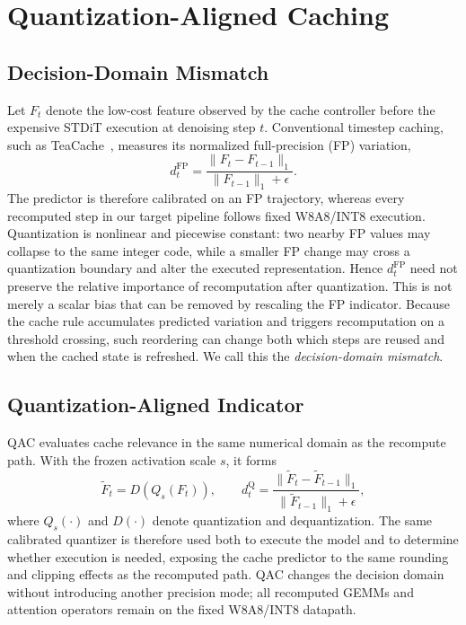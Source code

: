 \section{Quantization-Aligned Caching}
\label{sec:qac}

\subsection{Decision-Domain Mismatch}
Let $F_t$ denote the low-cost feature observed by the cache controller before the expensive STDiT execution at denoising step $t$. Conventional timestep caching, such as TeaCache~\cite{liu2025teacache}, measures its normalized full-precision (FP) variation,
\begin{equation}
 d_t^{\mathrm{FP}}=
 \frac{\lVert F_t-F_{t-1}\rVert_1}
      {\lVert F_{t-1}\rVert_1+\epsilon}.
 \label{eq:fp_indicator}
\end{equation}
The predictor is therefore calibrated on an FP trajectory, whereas every recomputed step in our target pipeline follows fixed W8A8/INT8 execution. Quantization is nonlinear and piecewise constant: two nearby FP values may collapse to the same integer code, while a smaller FP change may cross a quantization boundary and alter the executed representation. Hence $d_t^{\mathrm{FP}}$ need not preserve the relative importance of recomputation after quantization. This is not merely a scalar bias that can be removed by rescaling the FP indicator. Because the cache rule accumulates predicted variation and triggers recomputation on a threshold crossing, such reordering can change both which steps are reused and when the cached state is refreshed. We call this the \emph{decision-domain mismatch}.

\subsection{Quantization-Aligned Indicator}
QAC evaluates cache relevance in the same numerical domain as the recompute path. With the frozen activation scale $s$, it forms
\begin{equation}
 \widetilde F_t=D(Q_s(F_t)),\qquad
 d_t^{\mathrm Q}=
 \frac{\lVert\widetilde F_t-\widetilde F_{t-1}\rVert_1}
      {\lVert\widetilde F_{t-1}\rVert_1+\epsilon},
 \label{eq:q_indicator}
\end{equation}
where $Q_s(\cdot)$ and $D(\cdot)$ denote quantization and dequantization. The same calibrated quantizer is therefore used both to execute the model and to determine whether execution is needed, exposing the cache predictor to the same rounding and clipping effects as the recomputed path. QAC changes the decision domain without introducing another precision mode; all recomputed GEMMs and attention operators remain on the fixed W8A8/INT8 datapath.

